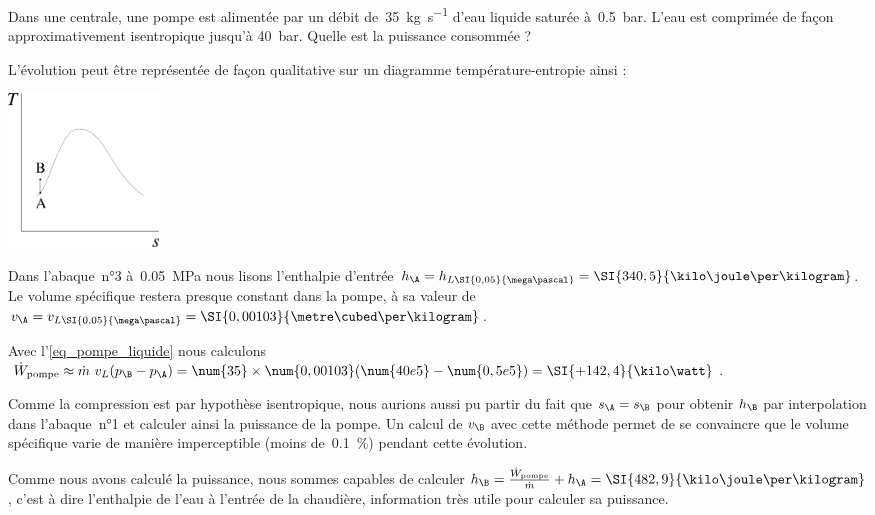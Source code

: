 		 	\begin{anexample}
		 	\label{exemple_pompe_centrale}
		 		Dans une centrale, une pompe est alimentée par un débit de~\SI{35}{\kilogram\per\second} d’eau liquide saturée à~\SI{0,5}{\bar}. L’eau est comprimée de façon approximativement isentropique jusqu’à \SI{40}{\bar}. Quelle est la puissance consommée ?
		 			\begin{answer}
			 			L’évolution peut être représentée de façon qualitative sur un diagramme température-entropie ainsi :
						\begin{center}\includegraphics[width=4cm]{images/exe_ts_pompe.png}\end{center}
		 				Dans l’abaque~n°3 à~\SI{0,05}{\mega\pascal} nous lisons l’enthalpie d’entrée $h_\A = h_{L \SI{0,05}{\mega\pascal}} = \SI{340,5}{\kilo\joule\per\kilogram}$. Le volume spécifique restera presque constant dans la pompe, à sa valeur de $v_\A = v_{L \SI{0,05}{\mega\pascal}} = \SI{0,00103}{\metre\cubed\per\kilogram}$.
		 				
		 				Avec l’\cref{eq_pompe_liquide} nous calculons $\dot W_\text{pompe} \approx \dot m \ v_L (p_\B - p_\A ) = \num{35} \times \num{0,00103} (\num{40e5} - \num{0,5e5}) = \SI{+142,4}{\kilo\watt}$.
		 				
		 					\begin{remark}Comme la compression est par hypothèse isentropique, nous aurions aussi pu partir du fait que $s_\A = s_\B$ pour obtenir $h_\B$ par interpolation dans l’abaque~n°1 et calculer ainsi la puissance de la pompe. Un calcul de $v_\B$ avec cette méthode permet de se convaincre que le volume spécifique varie de manière imperceptible (moins de~\SI{0,1}{\percent}) pendant cette évolution.\end{remark}
		 					\begin{remark}Comme nous avons calculé la puissance, nous sommes capables de calculer $h_\B = \frac{\dot W_\text{pompe}}{\dot m} + h_\A = \SI{482,9}{\kilo\joule\per\kilogram}$, c’est à dire l’enthalpie de l’eau à l’entrée de la chaudière, information très utile pour calculer sa puissance.\end{remark}
		 			\end{answer}
		 	\end{anexample}

